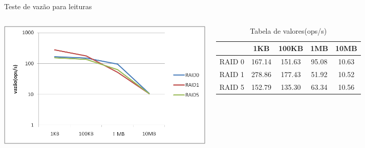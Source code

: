 \begin{frame}{}
	Teste de vazão para leituras
	\begin{columns}
		
		\includegraphics[width=\textwidth]{imagens/throughput_leitura}
		
		
		\begin{table}
			\caption{Tabela de valores(ops/s)}
			\tiny
			\begin{tabular}{|c|c|c|c|c|} \hline
				& 1KB & 100KB & 1MB & 10MB \\ \hline
				RAID 0	& 167.14 & 151.63 & 95.08 & 10.63\\ \hline
				RAID 1	& 278.86 & 177.43 & 51.92 & 10.52\\ \hline
				RAID 5	& 152.79 & 135.30 & 63.34 & 10.56\\ \hline
				
				
			\end{tabular}
		\end{table}
		
	\end{columns}
\end{frame}


